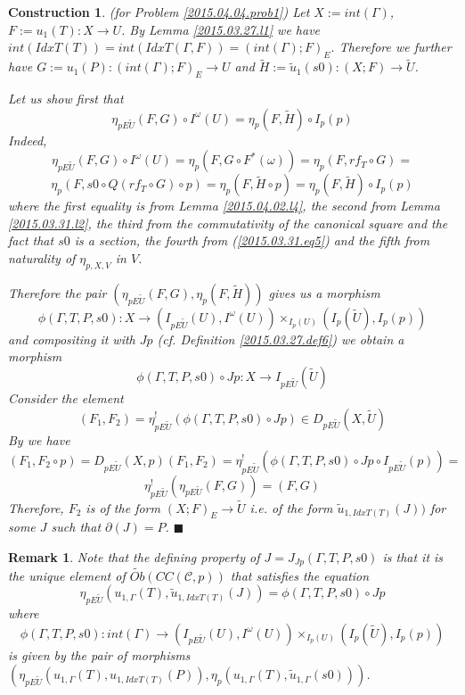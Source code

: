 \documentclass[12pt]{article}
\numberwithin{equation}{section}
\newtheorem{remark}[proposition]{Remark}
\newtheorem{construction0}[proposition]{Construction}
\newenvironment{construction}[1]{\begin{construction0}(for Problem \ref{#1})}{$\blacksquare$ \end{construction0}}
\newcommand{\llabel}[1]{\label{#1}}
\newcommand{\sr}{\rightarrow}
\newcommand{\wt}{\widetilde}
\newcommand{\toCC}{CC} %
\begin{document}
\begin{construction}{2015.04.04.prob1}\rm
\llabel{2015.04.04.constr1} Let $X:=int(\Gamma)$, $F:=u_1(T):X\sr U$. By Lemma
\ref{2015.03.27.l1} we have
$int(IdxT(T))=int(IdxT(\Gamma,F))=(int(\Gamma);F)_{E}$. Therefore we further
have $G:=u_1(P):(int(\Gamma);F)_{E}\sr U$ and $\wt{H}:=\wt{u}_1(s0):(X;F)\sr
\wt{U}$.

Let us show first that
%
$$\eta_{pE\wt{U}}(F,G)\circ I^{\omega}(U)=\eta_p(F,\wt{H})\circ I_p(p)$$
%
Indeed,
%
$$\eta_{pE\wt{U}}(F,G)\circ I^{\omega}(U)=\eta_p(F,G\circ
F^*(\omega))=\eta_p(F,rf_T\circ G)=$$
$$\eta_p(F,s0\circ Q(rf_T\circ G)\circ p)=\eta_p(F,\wt{H}\circ
p)=\eta_p(F,\wt{H})\circ I_p(p)$$
%
where the first equality is from Lemma \ref{2015.04.02.l4}, the second from
Lemma \ref{2015.03.31.l2}, the third from the commutativity of the canonical
square and the fact that $s0$ is a section, the fourth from
(\ref{2015.03.31.eq5}) and the fifth from naturality of $\eta_{p,X,V}$ in $V$.

Therefore the pair $(\eta_{pE\wt{U}}(F,G),\eta_p(F,\wt{H}))$ gives us a
morphism
%
$$\phi(\Gamma,T,P,s0):X\sr (I_{pE\wt{U}}(U), I^{\omega}(U)) \times_{I_p(U)}
(I_p(\wt{U}),I_p(p))$$
%
and compositing it with $Jp$ (cf. Definition \ref{2015.03.27.def6}) we obtain a
morphism
%
$$\phi(\Gamma,T,P,s0)\circ Jp: X\sr I_{pE\wt{U}}(\wt{U})$$
%
Consider the element
%
$$(F_1,F_2)=\eta^!_{pE\wt{U}}(\phi(\Gamma,T,P,s0)\circ Jp)\in
D_{pE\wt{U}}(X,\wt{U})$$
%
By \cite[Problem 3.8(1)]{fromunivwithPi} we have
%
$$(F_1,F_2\circ
p)=D_{pE\wt{U}}(X,p)(F_1,F_2)=\eta^!_{pE\wt{U}}(\phi(\Gamma,T,P,s0)\circ
Jp\circ I_{pE\wt{U}}(p))=$$
%
$$\eta^!_{pE\wt{U}}(\eta_{pE\wt{U}}(F,G))=(F,G)$$
%
Therefore, $F_2$ is of the form $(X;F)_E\sr \wt{U}$ i.e. of the form
$\wt{u}_{1,IdxT(T)}(J))$ for some $J$ such that $\partial(J)=P$.
\end{construction}
%
\begin{remark}\rm
\llabel{2015.05.08.rem1} Note that the defining property of
$J=J_{Jp}(\Gamma,T,P,s0)$ is that it is the unique element of
$\wt{Ob}(\toCC({\mathcal C},p))$ that satisfies the equation
%
$$\eta_{pE\wt{U}}(u_{1,\Gamma}(T),\wt{u}_{1,IdxT(T)}(J))=\phi(\Gamma,T,P,s0)\circ
Jp$$
%
where
%
$$\phi(\Gamma,T,P,s0):int(\Gamma)\sr
(I_{pE\wt{U}}(U),I^{\omega}(U))\times_{I_p(U)}(I_p(\wt{U}),I_p(p))$$
%
is given by the pair of morphisms $(\eta_{pE\wt{U}}(u_{1,\Gamma}(T),
u_{1,IdxT(T)}(P)), \eta_p(u_{1,\Gamma}(T),\wt{u}_{1,\Gamma}(s0)))$.
\end{remark}
%
\end{document}
